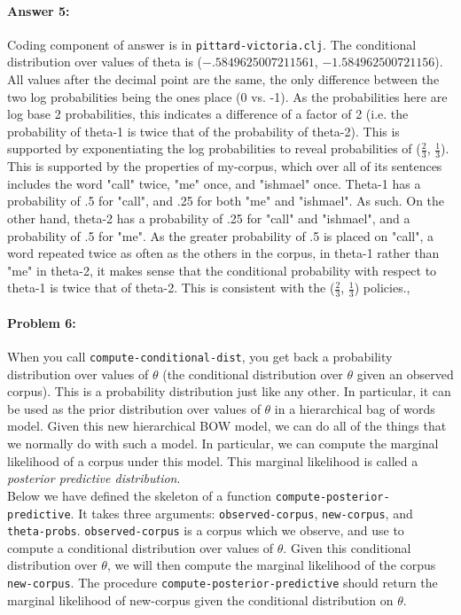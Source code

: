 \documentclass[10pt]{article}
\begin{document}
\paragraph{Answer 5:} Coding component of answer is in \texttt{pittard-victoria.clj}.\newline
The conditional distribution over values of theta is ($-.5849625007211561$, $-1.584962500721156$). All values after the decimal point are the same, the only difference between the two log probabilities being the ones place (0 vs. -1). As the probabilities here are log base 2 probabilities, this indicates a difference of a factor of 2 (i.e. the probability of theta-1 is twice that of the probability of theta-2). This is supported by exponentiating the log probabilities to reveal probabilities of ($\frac{2}{3}$, $\frac{1}{3}$). This is supported by the properties of my-corpus, which over all of its sentences includes the word "call" twice, "me" once, and "ishmael" once. Theta-1 has a probability of .5 for "call", and .25 for both "me" and "ishmael". As such. On the other hand, theta-2 has a probability of .25 for "call" and "ishmael", and a probability of .5 for "me". As the greater probability of .5 is placed on "call", a word repeated twice as often as the others in the corpus, in theta-1 rather than "me" in theta-2, it makes sense that the conditional probability with respect to theta-1 is twice that of theta-2. This is consistent with the ($\frac{2}{3}$, $\frac{1}{3}$) policies.,

\hrulefill
\paragraph{Problem 6:}
 
When you call \texttt{compute-conditional-dist}, you get back a
probability distribution over values of $\theta$ (the conditional
distribution over $\theta$ given an observed corpus). This is a
probability distribution just like any other. In particular, it can be
used as the prior distribution over values of $\theta$ in a
hierarchical bag of words model. Given this new hierarchical BOW
model, we can do all of the things that we normally do with such a
model. In particular, we can compute the marginal likelihood of a
corpus under this model. This marginal likelihood is called a
\emph{posterior predictive distribution}.
\\

\noindent Below we have defined the skeleton of a function
\texttt{compute-posterior-predictive}. It takes three arguments:
\texttt{observed-corpus}, \texttt{new-corpus}, and
\texttt{theta-probs}. \texttt{observed-corpus} is a corpus which we
observe, and use to compute a conditional distribution over values of
$\theta$. Given this conditional distribution over $\theta$, we will
then compute the marginal likelihood of the corpus
\texttt{new-corpus}. The procedure
\texttt{compute-posterior-predictive} should return the marginal
likelihood of new-corpus given the conditional distribution on
$\theta$.
\end{document}
